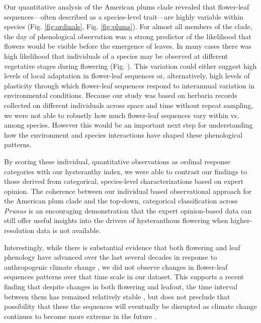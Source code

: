 \documentclass{article}[12pt]
\begin{document}
Our quantitative analysis of the American plums clade revealed that flower-leaf sequences---often described as a species-level trait---are highly variable within species (Fig. \ref{fig:ordinals}, Fig. \ref{fig:plums}). For almost all members of the clade, the day of phenological observation was a strong predictor of the likelihood that flowers would be visible before the emergence of leaves. In many cases there was high likelihood that individuals of a species may be observed at different vegetative stages during flowering (Fig. ). This variation could either suggest high levels of local adaptation in flower-leaf sequences or, alternatively, high levels of plasticity through which flower-leaf sequences respond to interannual variation in environmental conditions. Because our study was based on herbaria records collected on different individuals across space and time without repeat sampling, we were not able to robustly how much flower-leaf sequences vary within vs. among species. However this would be an important next step for understanding how the environment and species interactions have shaped these phenological patterns.


By scoring these individual, quantitative observations as ordinal response categories with our hysteranthy index, we were able to contrast our findings to those derived from categorical, species-level characterizations based on expert opinion. The coherence between our individual based observational approach for the American plum clade and the top-down, categorical classification across \emph{Prunus} is an encouraging demonstration that the expert opinion-based data can still offer useful insights into the drivers of hysteranthous flowering when higher-resolution data is not available. 

Interestingly, while there is substantial evidence that both flowering and leaf phenology have advanced over the last several decades in response to anthropogenic climate change \citep{Menzel2006,Cleland2007,Augspurger:2020aa}, we did not observe changes in flower-leaf sequences patterns over that time scale in our dataset. This supports a recent finding that despite changes in both flowering and leafout, the time interval between them has remained relatively stable \citep{Guo:2023wb}, but does not preclude that possibility that these the sequences will eventually be disrupted as climate change continues to become more extreme in the future \citep{Buonaiuto_2021}.
\end{document}

